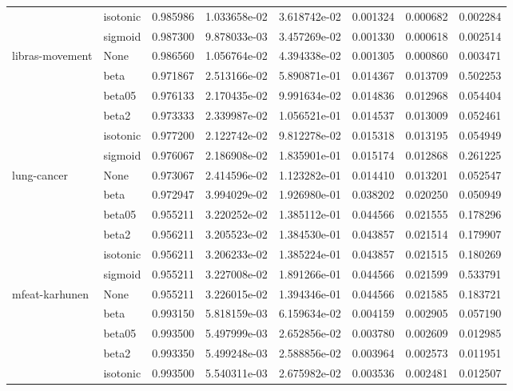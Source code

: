 \begin{tabular}{llrrrrrr}
        & isotonic &  0.985986 &  1.033658e-02 &  3.618742e-02 &  0.001324 &  0.000682 &  0.002284 \\
        & sigmoid &  0.987300 &  9.878033e-03 &  3.457269e-02 &  0.001330 &  0.000618 &  0.002514 \\
libras-movement & None &  0.986560 &  1.056764e-02 &  4.394338e-02 &  0.001305 &  0.000860 &  0.003471 \\
        & beta &  0.971867 &  2.513166e-02 &  5.890871e-01 &  0.014367 &  0.013709 &  0.502253 \\
        & beta05 &  0.976133 &  2.170435e-02 &  9.991634e-02 &  0.014836 &  0.012968 &  0.054404 \\
        & beta2 &  0.973333 &  2.339987e-02 &  1.056521e-01 &  0.014537 &  0.013009 &  0.052461 \\
        & isotonic &  0.977200 &  2.122742e-02 &  9.812278e-02 &  0.015318 &  0.013195 &  0.054949 \\
        & sigmoid &  0.976067 &  2.186908e-02 &  1.835901e-01 &  0.015174 &  0.012868 &  0.261225 \\
lung-cancer & None &  0.973067 &  2.414596e-02 &  1.123282e-01 &  0.014410 &  0.013201 &  0.052547 \\
        & beta &  0.972947 &  3.994029e-02 &  1.926980e-01 &  0.038202 &  0.020250 &  0.050949 \\
        & beta05 &  0.955211 &  3.220252e-02 &  1.385112e-01 &  0.044566 &  0.021555 &  0.178296 \\
        & beta2 &  0.956211 &  3.205523e-02 &  1.384530e-01 &  0.043857 &  0.021514 &  0.179907 \\
        & isotonic &  0.956211 &  3.206233e-02 &  1.385224e-01 &  0.043857 &  0.021515 &  0.180269 \\
        & sigmoid &  0.955211 &  3.227008e-02 &  1.891266e-01 &  0.044566 &  0.021599 &  0.533791 \\
mfeat-karhunen & None &  0.955211 &  3.226015e-02 &  1.394346e-01 &  0.044566 &  0.021585 &  0.183721 \\
        & beta &  0.993150 &  5.818159e-03 &  6.159634e-02 &  0.004159 &  0.002905 &  0.057190 \\
        & beta05 &  0.993500 &  5.497999e-03 &  2.652856e-02 &  0.003780 &  0.002609 &  0.012985 \\
        & beta2 &  0.993350 &  5.499248e-03 &  2.588856e-02 &  0.003964 &  0.002573 &  0.011951 \\
        & isotonic &  0.993500 &  5.540311e-03 &  2.675982e-02 &  0.003536 &  0.002481 &  0.012507 \\

\end{tabular}
